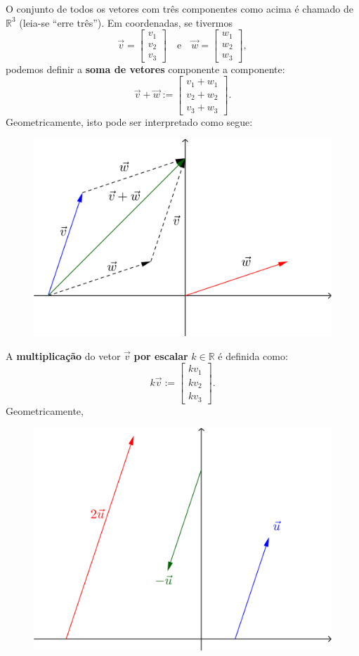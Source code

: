 O conjunto de todos os vetores com três componentes como acima é chamado de $\mathbb{R}^3$ (leia-se ``erre três''). Em coordenadas, se tivermos
\begin{equation}
\vec{v} =
\left[
  \begin{array}{c}
    v_1 \\
    v_2 \\
    v_3
  \end{array}
\right]  \quad  \text{e} \quad
\vec{w} =
\left[
  \begin{array}{c}
    w_1 \\
    w_2 \\
    w_3
  \end{array}
\right],
\end{equation} podemos definir a \textbf{soma de vetores} componente a componente:
\begin{equation}
\vec{v} + \vec{w} :=
\left[
  \begin{array}{c}
    v_1 + w_1 \\
    v_2 + w_2 \\
    v_3 + w_3
  \end{array}
\right].
\end{equation} Geometricamente, isto pode ser interpretado como segue:
\begin{figure}[h!]
\begin{center}
\includegraphics[width=0.3\linewidth]{Semana02/semana02-soma}
\end{center}
\end{figure}

A \textbf{multiplicação} do vetor $\vec{v}$ \textbf{por escalar} $k \in \mathbb{R}$ é definida como:
\begin{equation}
k \vec{v} :=
\left[
  \begin{array}{c}
    k v_1 \\
    k v_2 \\
    k v_3
  \end{array}
\right].
\end{equation} Geometricamente,
\begin{figure}[h!]
\begin{center}
\includegraphics[width=0.3\linewidth]{Semana02/semana02-escalar}
\end{center}
\end{figure}



